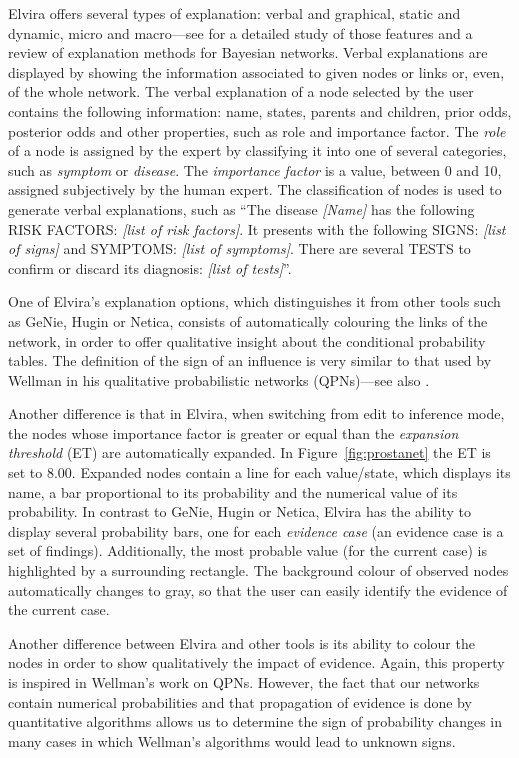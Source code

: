 Elvira offers several types of explanation: verbal and graphical, static and
dynamic, micro and macro---see \cite{lacave02a} for a detailed study of those
features and a review of explanation methods for Bayesian networks. Verbal
explanations are displayed by showing the information associated to given
nodes or links or, even, of the whole network. The verbal explanation of a
node selected by the user contains the following information: name, states,
parents and children, prior odds, posterior odds and other properties, such as
role and importance factor. The \emph{role} of a node is assigned by the
expert by classifying it into one of several categories, such as
\textit{symptom} or \textit{disease}. The \emph{importance factor}
is a value, between 0 and 10, assigned subjectively by the human
expert. The classification of nodes is used to generate verbal explanations,
such as ``\textsf{The disease \emph{[Name]} has the following RISK FACTORS:
\emph{[list of risk factors]}. It presents with the following SIGNS:
\emph{[list of signs]} and SYMPTOMS: \emph{[list of symptoms]}. There
are
several TESTS to confirm or discard its diagnosis:\emph{ [list of tests]}}''.

One of Elvira's explanation options, which distinguishes it from
other tools such as GeNie, Hugin or Netica, consists of
automatically colouring the links of the network, in order to
offer qualitative insight about the conditional probability
tables. The definition of the sign of an influence is very similar
to that used by Wellman \cite{wellman90a} in his qualitative
probabilistic networks (QPNs)---see also \cite{lacave02b}.

Another difference is that in Elvira, when switching from edit to
inference mode, the nodes whose importance factor is greater or
equal than the \emph{expansion threshold} (ET) are automatically
expanded. In Figure~\ref{fig:prostanet} the ET is set to 8.00.
Expanded nodes contain a line for each value/state, which displays
its name, a bar proportional to its probability and the numerical
value of its probability. In contrast to GeNie, Hugin or Netica,
Elvira has the ability to display several probability bars, one
for each \emph{evidence case} (an evidence case is a set of
findings). Additionally, the most probable value (for the current
case) is highlighted by a surrounding rectangle. The background
colour of observed nodes automatically changes to gray, so that
the user can easily identify the evidence of the current case.

Another difference between Elvira and other tools is its ability
to colour the nodes in order to show qualitatively the impact of
evidence. Again, this property is inspired in Wellman's work on
QPNs. However, the fact that our networks contain numerical
probabilities and that propagation of evidence is done by
quantitative algorithms allows us to determine the sign of
probability changes in many cases in which Wellman's algorithms
would lead to unknown signs.

